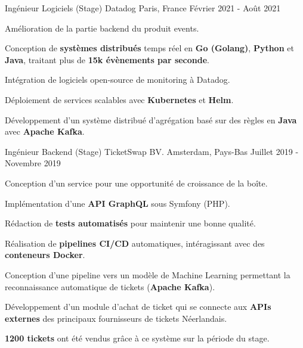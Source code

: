 

\begin{cventries}

  \cventry
    {Ingénieur Logiciels (Stage)} %
    {Datadog} %
    {Paris, France} %
    {Février 2021 - Août 2021} %
    {
      \begin{cvitems} %
        \item {Amélioration de la partie backend du produit events.}
        \item {Conception de \textbf{systèmes distribués} temps réel en \textbf{Go (Golang)}, \textbf{Python} et \textbf{Java}, traitant plus de \textbf{15k évènements par seconde}.}
        \item {Intégration de logiciels open-source de monitoring à Datadog.}
        \item {Déploiement de services scalables avec \textbf{Kubernetes} et \textbf{Helm}.}
        \item {Développement d'un système distribué d'agrégation basé sur des règles en \textbf{Java} avec \textbf{Apache Kafka}.}
      \end{cvitems}
    }

  \cventry
    {Ingénieur Backend (Stage)} %
    {TicketSwap BV.} %
    {Amsterdam, Pays-Bas} %
    {Juillet 2019 - Novembre 2019} %
    {
      \begin{cvitems} %
        \item {Conception d'un service pour une opportunité de croissance de la boîte.}
        \item {Implémentation d'une \textbf{API GraphQL} sous Symfony (PHP).}
        \item {Rédaction de \textbf{tests automatisés} pour maintenir une bonne qualité.}
        \item {Réalisation de \textbf{pipelines CI/CD} automatiques, intéragissant avec des \textbf{conteneurs Docker}.}
        \item {Conception d'une pipeline vers un modèle de Machine Learning permettant la reconnaissance automatique de tickets (\textbf{Apache Kafka}).}
        \item {Développement d'un module d'achat de ticket qui se connecte aux \textbf{APIs externes} des principaux fournisseurs de tickets Néerlandais.}
        \item {\textbf{1200 tickets} ont été vendus grâce à ce système sur la période du stage.}
      \end{cvitems}
    }

\end{cventries}
